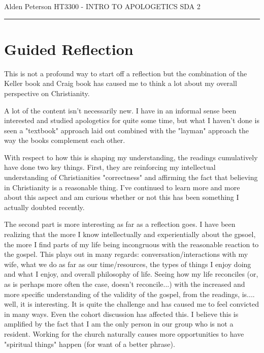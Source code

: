 \documentclass[12pt]{turabian-researchpaper}
\begin{document}
\begin{singlespace}
\noindent Alden Peterson \newline
\noindent HT3300 - INTRO TO APOLOGETICS \newline
\noindent SDA 2 \newline
\noindent\rule{4cm}{0.4pt}
\end{singlespace}


\section{Guided Reflection}

This is not  a profound way to start off a reflection but the combination of the Keller book and Craig book has caused me to think a lot about my overall perspective on Christianity. 

A lot of the content isn't necessarily new. I have in an informal sense been interested and studied apologetics for quite some time, but what I haven't done is seen a "textbook" approach laid out combined with the "layman" approach the way the books complement each other.

With respect to how this is shaping my understanding, the readings cumulatively have done two key things. First, they are reinforcing my intellectual understanding of Christianities "correctness" and affirming the fact that believing in Christianity is a reasonable thing. I've continued to learn more and more about this aspect and am curious whether or not this has been something I actually doubted recently.

The second part is more interesting as far as a reflection goes. I have been realizing that the more I know intellectually and experientially about the gpsoel, the more I find parts of my life being incongruous with the reasonable reaction to the gospel. This plays out in many regards: conversation/interactions with my wife, what we do as far as our time/resources, the types of things I enjoy doing and what I enjoy, and overall philosophy of life. Seeing how my life reconciles (or, as is perhaps more often the case, doesn't reconcile...) with the increased and more specific understanding of the validity of the gospel, from the readings, is.... well, it is interesting. It is quite the challenge and has caused me to feel convicted in many ways. Even the cohort discussion has affected this. I believe this is amplified by the fact that I am the only person in our group who is not a resident. Working for the church naturally causes more opportunities to have "spiritual things" happen (for want of a better phrase).
\end{document}
